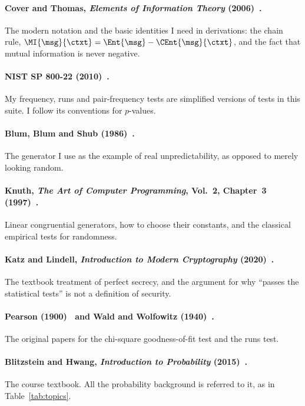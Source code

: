 \paragraph{Cover and Thomas, \emph{Elements of Information Theory}
  (2006)~\cite{cover2006}.}
The modern notation and the basic identities I need in derivations: the chain
rule, $\MI{\msg}{\ctxt} = \Ent{\msg} - \CEnt{\msg}{\ctxt}$, and the fact that
mutual information is never negative.

\paragraph{NIST SP 800-22 (2010)~\cite{nistsp80022}.}
My frequency, runs and pair-frequency tests are simplified versions of tests
in this suite. I follow its conventions for $p$-values.

\paragraph{Blum, Blum and Shub (1986)~\cite{blum1986}.}
The generator I use as the example of real unpredictability, as opposed to
merely looking random.

\paragraph{Knuth, \emph{The Art of Computer Programming}, Vol.~2, Chapter~3
  (1997)~\cite{knuth1997}.}
Linear congruential generators, how to choose their constants, and the
classical empirical tests for randomness.

\paragraph{Katz and Lindell, \emph{Introduction to Modern Cryptography}
  (2020)~\cite{katz2020}.}
The textbook treatment of perfect secrecy, and the argument for why ``passes
the statistical tests'' is not a definition of security.

\paragraph{Pearson (1900)~\cite{pearson1900} and Wald and Wolfowitz
  (1940)~\cite{wald1940}.}
The original papers for the chi-square goodness-of-fit test and the runs test.

\paragraph{Blitzstein and Hwang, \emph{Introduction to Probability}
  (2015)~\cite{blitzstein2015}.}
The course textbook. All the probability background is referred to it, as in
Table~\ref{tab:topics}.

